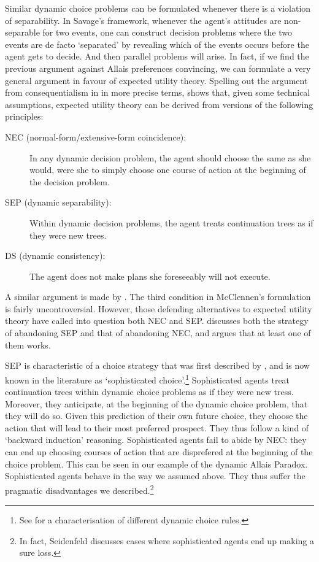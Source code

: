Similar dynamic choice problems can be formulated whenever there is a violation of separability. In Savage's framework, whenever the agent's attitudes are non-separable for two events, one can construct decision problems where the two events are de facto `separated' by revealing which of the events occurs before the agent gets to decide. And then parallel problems will arise. In fact, if we find the previous argument against Allais preferences convincing, we can formulate a very general argument in favour of expected utility theory. Spelling out the argument from consequentialism in \citet{Hammond1988} in more precise terms, \citet{McClennen1990} shows that, given some technical assumptions, expected utility theory can be derived from versions of the following principles:
\begin{description}
\item[NEC (normal-form/extensive-form coincidence):] In any dyn\-amic decision problem, the agent should choose the same as she would, were she to simply choose one course of action at the beginning of the decision problem.
\item[SEP (dynamic separability):] Within dynamic decision problems, the agent treats continuation trees as if they were new trees.
\item[DS (dynamic consistency):] The agent does not make plans she foreseeably will not execute.
\end{description}

A similar argument is made by \citet{Seidenfeld1988}. The third condition in McClennen's formulation is fairly uncontroversial. However, those defending alternatives to expected utility theory have called into question both NEC and SEP. \citet{Buchak2013} discusses both the strategy of abandoning SEP and that of abandoning NEC, and argues that at least one of them works.

SEP is characteristic of a choice strategy that was first described by \citet{Strotz1956}, and is now known in the literature as `sophisticated choice'.\footnote{See \citet{McClennen1990} for a characterisation of different dynamic choice rules.} Sophisticated agents treat continuation trees within dynamic choice problems as if they were new tress. Moreover, they anticipate, at the beginning of the dynamic choice problem, that they will do so. Given this prediction of their own future choice, they choose the action that will lead to their most preferred prospect. They thus follow a kind of `backward induction' reasoning. Sophisticated agents fail to abide by NEC: they can end up choosing courses of action that are disprefered at the beginning of the choice problem. This can be seen in our example of the dynamic Allais Paradox. Sophisticated agents behave in the way we assumed above. They thus suffer the pragmatic disadvantages we described.\footnote{In fact, Seidenfeld discusses cases where sophisticated agents end up making a sure loss.}

